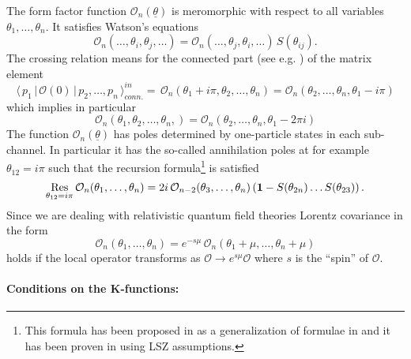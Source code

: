 \documentclass[a4paper,a4paper]{article}
\begin{document}
The form factor function $\mathcal{O}_{n}({\underline{\theta }})$ is
meromorphic with respect to all variables $\theta _{1},\dots ,\theta _{n}$.
It satisfies Watson's equations 
\begin{equation}
\mathcal{O}_{n}(\dots ,\theta _{i},\theta _{j},\dots )=\mathcal{O}_{n}(\dots
,\theta _{j},\theta _{i},\dots )\,S(\theta _{ij}).  \label{pf1}
\end{equation}
The crossing relation means for the connected part (see e.g. \cite{BK}) of
the matrix element 
\[
\langle \,p_{1}\,|\,\mathcal{O}(0)\,|\,p_{2},\dots ,p_{n}\,\rangle
_{conn.}^{in}=\,\mathcal{O}_{n}(\theta _{1}+i\pi ,\theta _{2},\dots ,\theta
_{n})=\mathcal{O}_{n}(\theta _{2},\dots ,\theta _{n},\theta _{1}-i\pi ) 
\]
which implies in particular 
\begin{equation}
\mathcal{O}_{n}(\theta _{1},\theta _{2},\dots ,\theta _{n},)=\mathcal{O}%
_{n}(\theta _{2},\dots ,\theta _{n},\theta _{1}-2\pi i)  \label{pf2}
\end{equation}
The function $\mathcal{O}_{n}({\underline{\theta }})$ has poles determined
by one-particle states in each sub-channel. In particular it has the
so-called annihilation poles at for example $\theta _{12}=i\pi $ such that
the recursion formula\footnote{%
This formula has been proposed in \cite{Sm} as a generalization of formulae
in \cite{KW} and it has been proven in \cite{BFKZ} using LSZ assumptions.}
is satisfied 
\begin{equation}
\mathop{\rm Res}_{\theta _{12}=i\pi }\mathcal{O}_{n}(\theta _{1},\dots
,\theta _{n})=2i\,\mathcal{O}_{n-2}(\theta _{3},\dots ,\theta _{n})\left( 
\mathbf{1}-S(\theta _{2n})\dots S(\theta _{23})\right) .  \label{pf3}
\end{equation}
Since we are dealing with relativistic quantum field theories Lorentz
covariance in the form 
\begin{equation}
\mathcal{O}_{n}(\theta _{1},\dots ,\theta _{n})=e^{-s\mu }\,\mathcal{O}%
_{n}(\theta _{1}+\mu ,\dots ,\theta _{n}+\mu )  \label{pf5}
\end{equation}
holds if the local operator transforms as $\mathcal{O}\to e^{s\mu }\mathcal{O%
}$ where $s$ is the ``spin'' of $\mathcal{O}$.

\paragraph{Conditions on the K-functions:}
\end{document}
